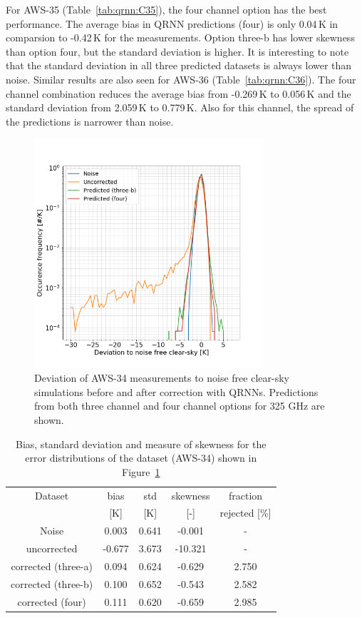 \documentclass[12pt]{article}
\begin{document}
For AWS-35 (Table~\ref{tab:qrnn:C35}), the four channel option has the best performance. The average bias in QRNN predictions (four) is only 0.04\,K in comparsion to -0.42\,K for the measurements. Option three-b has lower skewness than option four, but the standard deviation is higher. It is interesting to note that the standard deviation in all three predicted datasets is always lower than noise. Similar results are also seen for AWS-36 (Table~\ref{tab:qrnn:C36}). The four channel combination reduces the average bias from -0.269\,K to 0.056\,K and the standard deviation from 2.059\,K to 0.779\,K. Also for this channel, the spread of the predictions is narrower than noise.  

\begin{figure}[!tb]
	\centering
	\includegraphics[height=85mm]{Channel_C34.png}
	\caption{Deviation of AWS-34 measurements to noise free clear-sky
		simulations before and after correction with QRNNs. Predictions from both three channel and four channel options for 325 GHz are shown. }
	\label{fig:qrnn_C34:deviations}
\end{figure}

\begin{table}[!p]
	\centering
	\begin{tabular}[b]{c|c|c|c|c}
	Dataset  		  &   bias &   std &   skewness & fraction  \\
	&   [K]  &   [K] & [-] & rejected [\%]\\
		\hline
Noise                       &  0.003 & 0.641 &             -0.001 &      - \\
uncorrected                 & -0.677 & 3.673 &            -10.321 &      - \\
corrected (three-a) 		&  0.094 & 0.624 &             -0.629 &      2.750 \\
corrected (three-b) 		&  0.100 & 0.652 &             -0.543 &      2.582 \\
corrected (four)   			&  0.111 & 0.620 &             -0.659 &      2.985 \\
		\hline
	\end{tabular}
	\caption{ Bias, standard deviation and measure of skewness for the error distributions of the dataset (AWS-34) shown in Figure~\ref{fig:qrnn_C34:deviations}}
	\label{tab:qrnn:C34}
\end{table}
\end{document}
